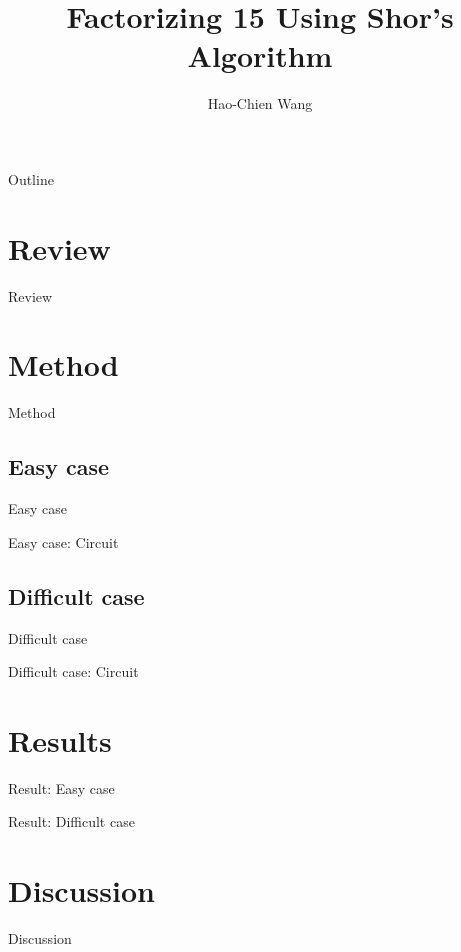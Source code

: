\documentclass{beamer}
\title[Factorizing 15]{Factorizing 15 Using Shor's Algorithm}
\author{Hao-Chien Wang}
\institute[NTUPhys]{Department of Physics, National Taiwan University}
\begin{document}
\begin{frame}
	\titlepage
\end{frame}

\begin{frame}{Outline}
	\tableofcontents
\end{frame}

\section{Review}%
\label{sec:review}

\begin{frame}{Review}
	
\end{frame}

\section{Method}%
\label{sec:method}

\begin{frame}{Method}

\end{frame}

\subsection{Easy case}%
\label{sub:easy_case}

\begin{frame}{Easy case}
	
\end{frame}

\begin{frame}{Easy case: Circuit}
	
\end{frame}

\subsection{Difficult case}%
\label{sub:difficult_case}

\begin{frame}{Difficult case}
	
\end{frame}

\begin{frame}{Difficult case: Circuit}
	
\end{frame}

\section{Results}%
\label{sec:results}

\begin{frame}{Result: Easy case}
	
\end{frame}

\begin{frame}{Result: Difficult case}
	
\end{frame}

\section{Discussion}%
\label{sec:discussion}

\begin{frame}{Discussion}
	
\end{frame}
\end{document}
